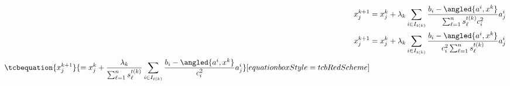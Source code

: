 \begin{tcbenvironment}
\begin{tcbparbox}
\begin{align*}
	x_j^{k+1} &= x_j^k + \lambda_k\sum_{i\in I_{t(k)}}\dfrac{b_i-\angled{a^i, x^k}}{\sum_{\ell=1}^n s_\ell^{t(k)}c_i^2}a_j^i\\
    x_j^{k+1} &= x_j^k + \lambda_k\sum_{i\in I_{t(k)}}\dfrac{b_i-\angled{a^i, x^k}}{c_i^2\sum_{\ell=1}^n s_\ell^{t(k)}}a_j^i\\
    \tcbequation%
    {x_j^{k+1} }{= x_j^k + \dfrac{\lambda_k}{\sum_{\ell=1}^n s_\ell^{t(k)}}\sum_{i\in I_{t(k)}}\dfrac{b_i-\angled{a^i, x^k}}{c_i^2}a_j^i}%
    [equationboxStyle={tcbRedScheme}]
\end{align*}
\end{tcbparbox}
\end{tcbenvironment}
\endinput
